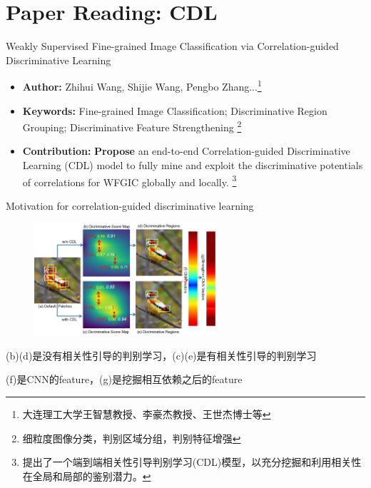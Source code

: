 \section{Paper Reading: CDL}

\begin{frame}{Weakly Supervised Fine-grained Image Classification via Correlation-guided Discriminative Learning}
    \begin{itemize}
        \item \textbf{Author:} Zhihui Wang, Shijie Wang, Pengbo Zhang...\footnote{大连理工大学王智慧教授、李豪杰教授、王世杰博士等}
        \item \textbf{Keywords:} Fine-grained Image Classification; Discriminative Region Grouping; Discriminative Feature Strengthening
        \footnote{细粒度图像分类，判别区域分组，判别特征增强}
        \item \textbf{Contribution:} \textbf{Propose} an end-to-end Correlation-guided Discriminative Learning (CDL) model to fully mine and exploit the discriminative potentials of correlations for WFGIC globally and locally. 
        \footnote{提出了一个端到端相关性引导判别学习(CDL)模型，以充分挖掘和利用相关性在全局和局部的鉴别潜力。}
    \end{itemize}
\end{frame}

\begin{frame}{Motivation for correlation-guided discriminative learning}
    \begin{figure}[htb]
        \centering
        \includegraphics[width=0.6\textwidth]{docs/paperReading/CDL/summary.png}
    \end{figure}
    \begin{scriptsize}
        (b)(d)是没有相关性引导的判别学习，(c)(e)是有相关性引导的判别学习
        
        (f)是CNN的feature，(g)是挖掘相互依赖之后的feature
    \end{scriptsize}
\end{frame}



